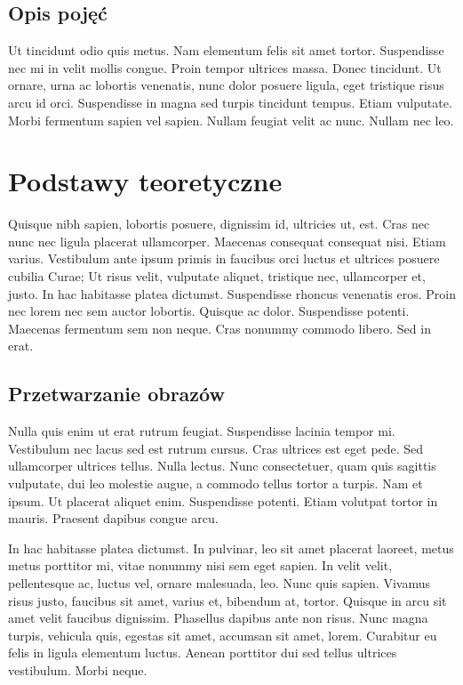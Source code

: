 \documentclass[eng,printmode]{mgr}
\begin{document}
\section{Opis pojęć}
Ut tincidunt odio quis metus. Nam elementum felis sit amet tortor. Suspendisse nec mi in velit mollis congue. Proin tempor ultrices massa. Donec tincidunt. Ut ornare, urna ac lobortis venenatis, nunc dolor posuere ligula, eget tristique risus arcu id orci. Suspendisse in magna sed turpis tincidunt tempus. Etiam vulputate. Morbi fermentum sapien vel sapien. Nullam feugiat velit ac nunc. Nullam nec leo.


\chapter{Podstawy teoretyczne}
Quisque nibh sapien, lobortis posuere, dignissim id, ultricies ut, est. Cras nec nunc nec ligula placerat ullamcorper. Maecenas consequat consequat nisi. Etiam varius. Vestibulum ante ipsum primis in faucibus orci luctus et ultrices posuere cubilia Curae; Ut risus velit, vulputate aliquet, tristique nec, ullamcorper et, justo. In hac habitasse platea dictumst. Suspendisse rhoncus venenatis eros. Proin nec lorem nec sem auctor lobortis. Quisque ac dolor. Suspendisse potenti. Maecenas fermentum sem non neque. Cras nonummy commodo libero. Sed in erat.


\section{Przetwarzanie obrazów}
Nulla quis enim ut erat rutrum feugiat. Suspendisse lacinia tempor mi. Vestibulum nec lacus sed est rutrum cursus. Cras ultrices est eget pede. Sed ullamcorper ultrices tellus. Nulla lectus. Nunc consectetuer, quam quis sagittis vulputate, dui leo molestie augue, a commodo tellus tortor a turpis. Nam et ipsum. Ut placerat aliquet enim. Suspendisse potenti. Etiam volutpat tortor in mauris. Praesent dapibus congue arcu.

In hac habitasse platea dictumst. In pulvinar, leo sit amet placerat laoreet, metus metus porttitor mi, vitae nonummy nisi sem eget sapien. In velit velit, pellentesque ac, luctus vel, ornare malesuada, leo. Nunc quis sapien. Vivamus risus justo, faucibus sit amet, varius et, bibendum at, tortor. Quisque in arcu sit amet velit faucibus dignissim. Phasellus dapibus ante non risus. Nunc magna turpis, vehicula quis, egestas sit amet, accumsan sit amet, lorem. Curabitur eu felis in ligula elementum luctus. Aenean porttitor dui sed tellus ultrices vestibulum. Morbi neque.
\end{document}
